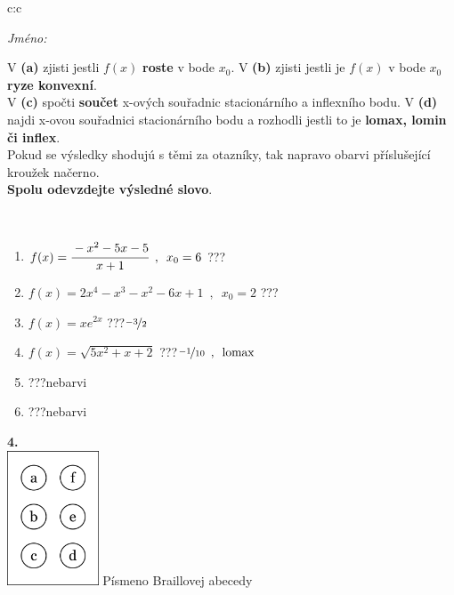 \documentclass[10pt]{report}
\begin{document}
\begin{tabular}{c:c}
\begin{minipage}[c][104.5mm][t]{0.5\linewidth}
\begin{center}
\textit{Jméno:}\phantom{xxxxxxxxxxxxxxxxxxxxxxxxxxxxxxxxxxxxxxxxxxxxxxxxxxxxxxxxxxxxxxxxx}\\[5mm]
\begin{minipage}{0.95\linewidth}
\begin{center}
{\small V \textbf{(a)} zjisti jestli $f(x)$ \textbf{roste} v bode $x_0$. V \textbf{(b)} zjisti jestli je $f(x)$ v bode $x_0$ \textbf{ryze konvexní}.\\V \textbf{(c)} spočti \textbf{součet} x-ových souřadnic stacionárního a inflexního bodu. V \textbf{(d)} najdi x-ovou souřadnici stacionárního bodu a rozhodli jestli to je \textbf{lomax, lomin či inflex}.\\Pokud se výsledky shodujú s těmi za otazníky, tak napravo obarvi příslušející kroužek načerno.\\\textbf{Spolu odevzdejte výsledné slovo}}.
\end{center}
\end{minipage}
\\[1mm]
\begin{minipage}{0.79\linewidth}
\begin{center}
\begin{varwidth}{\linewidth}
\begin{enumerate}
\normalsize
\item $f(x)=\cfrac{-x^2-5x-5}{x+1}\enspace , \enspace x_0=6$\quad \dotfill\; ???\;\dotfill \quad {}
\item $f(x)=2x^4-x^3-x^2-6x+1\enspace , \enspace x_0=2$\quad \dotfill\; ???\;\dotfill \quad {}
\item $f(x)=xe^{2x}$\quad \dotfill\; ???\;\dotfill \quad $\nicefrac{-3}{2}$
\item $f(x)=\sqrt{5x^2+x+2}$\quad \dotfill\; ???\;\dotfill \quad $\nicefrac{-1}{10}\enspace , \enspace\mathrm{lomax}$
\item \quad \dotfill\; ???\;\dotfill \quad nebarvi
\item \quad \dotfill\; ???\;\dotfill \quad nebarvi
\end{enumerate}
\end{varwidth}
\end{center}
\end{minipage}
\begin{minipage}{0.20\linewidth}
\begin{center}
{\Huge\bfseries 4.} \\[2mm]
\includegraphics[height=40mm]{../images/braille.png}
{\small Písmeno Braillovej abecedy}
\end{center}
\end{minipage}
\end{center}
\end{minipage}
%
\end{tabular}
\end{document}

